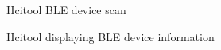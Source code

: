 \documentclass{article}
\begin{document}
\begin{figure}[!htb]
\caption{Hcitool BLE device scan}
\end{figure}

\begin{figure}[!htb]
\caption{Hcitool displaying BLE device information}
\end{figure}
\end{document}
